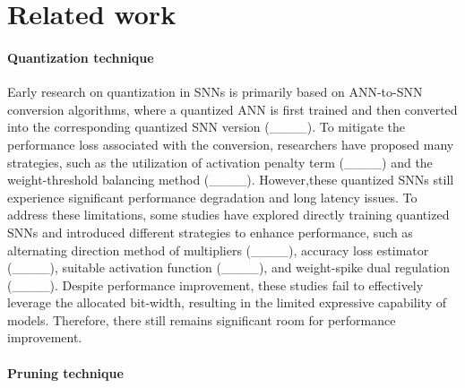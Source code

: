 \section{Related work}
\paragraph{Quantization technique}
Early research on quantization in SNNs is primarily based on ANN-to-SNN conversion algorithms, where a quantized ANN is first trained and then converted into the corresponding quantized SNN version (____).
To mitigate the performance loss associated with the conversion, researchers have proposed many strategies, such as the utilization of activation penalty term (____) and the weight-threshold balancing method (____). 
However,these quantized SNNs still experience significant performance degradation and long latency issues.
To address these limitations, some studies have explored directly training quantized SNNs and introduced different strategies to enhance performance, such as alternating direction method of multipliers (____), accuracy loss estimator (____), suitable activation function (____), and weight-spike dual regulation (____).
Despite performance improvement, these studies fail to effectively leverage the allocated bit-width, resulting in the limited expressive capability of models. 
Therefore, there still remains significant room for performance improvement.



\paragraph{Pruning technique}

